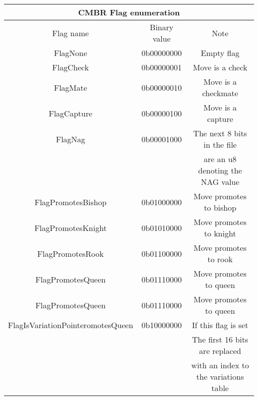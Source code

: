 \documentclass{article}
\begin{document}
\begin{center}
\begin{tabular}{|c|c|c|}
 \hline
 \multicolumn{3}{|c|}{CMBR Flag enumeration} \\
 \hline
 Flag name & Binary value & Note \\
 \hline
 FlagNone & 0b00000000 & Empty flag \\
 \hline
 FlagCheck & 0b00000001 & Move is a check \\
 \hline
 FlagMate & 0b00000010 & Move is a checkmate \\
 \hline
 FlagCapture & 0b00000100 & Move is a capture \\
 \hline
 FlagNag & 0b00001000 & The next 8 bits in the file \\
  & &  are an u8 denoting the NAG value \\ 
 \hline
 FlagPromotesBishop & 0b01000000 & Move promotes to bishop \\
 \hline
 FlagPromotesKnight & 0b01010000 & Move promotes to knight \\
 \hline
 FlagPromotesRook & 0b01100000 & Move promotes to rook \\
 \hline
 FlagPromotesQueen & 0b01110000 & Move promotes to queen \\
 \hline
 FlagPromotesQueen & 0b01110000 & Move promotes to queen \\
 \hline
 FlagIsVariationPointeromotesQueen & 0b10000000 & If this flag is set \\
 & & The first 16 bits are replaced \\
 & & with an index to the variations table \\
 \hline
\end{tabular}
\end{center}
\end{document}
